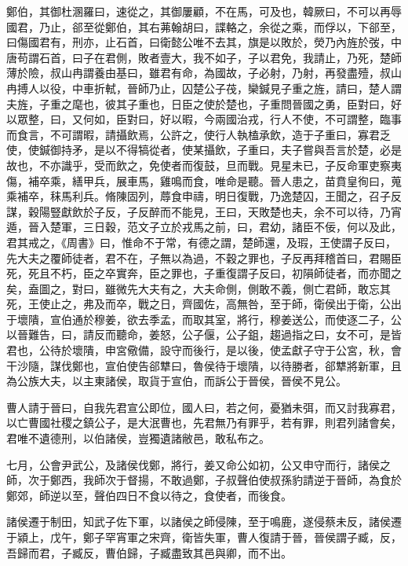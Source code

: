 \begin{pinyinscope}
鄭伯，其御杜溷羅曰，速從之，其御屢顧，不在馬，可及也，韓厥曰，不可以再辱國君，乃止，郤至從鄭伯，其右茀翰胡曰，諜輅之，余從之乘，而俘以，下郤至，曰傷國君有，刑亦，止石首，曰衛懿公唯不去其，旗是以敗於，熒乃內旌於弢，中唐苟謂石首，曰子在君側，敗者壹大，我不如子，子以君免，我請止，乃死，楚師薄於險，叔山冉謂養由基曰，雖君有命，為國故，子必射，乃射，再發盡殪，叔山冉搏人以役，中車折軾，晉師乃止，囚楚公子茷，欒鍼見子重之旌，請曰，楚人謂夫旌，子重之麾也，彼其子重也，日臣之使於楚也，子重問晉國之勇，臣對曰，好以眾整，曰，又何如，臣對曰，好以暇，今兩國治戎，行人不使，不可謂整，臨事而食言，不可謂暇，請攝飲焉，公許之，使行人執榼承飲，造于子重曰，寡君乏使，使鍼御持矛，是以不得犒從者，使某攝飲，子重曰，夫子嘗與吾言於楚，必是故也，不亦識乎，受而飲之，免使者而復鼓，旦而戰。見星未已，子反命軍吏察夷傷，補卒乘，繕甲兵，展車馬，雞鳴而食，唯命是聽。晉人患之，苗賁皇徇曰，蒐乘補卒，秣馬利兵。脩陳固列，蓐食申禱，明日復戰，乃逸楚囚，王聞之，召子反謀，穀陽豎獻飲於子反，子反醉而不能見，王曰，天敗楚也夫，余不可以待，乃宵遁，晉入楚軍，三日穀，范文子立於戎馬之前，曰，君幼，諸臣不佞，何以及此，君其戒之，《周書》曰，惟命不于常，有德之謂，楚師還，及瑕，王使謂子反曰，先大夫之覆師徒者，君不在，子無以為過，不穀之罪也，子反再拜稽首曰，君賜臣死，死且不朽，臣之卒實奔，臣之罪也，子重復謂子反曰，初隕師徒者，而亦聞之矣，盍圖之，對曰，雖微先大夫有之，大夫命側，側敢不義，側亡君師，敢忘其死，王使止之，弗及而卒，戰之日，齊國佐，高無咎，至于師，衛侯出于衛，公出于壞隤，宣伯通於穆姜，欲去季孟，而取其室，將行，穆姜送公，而使逐二子，公以晉難告，曰，請反而聽命，姜怒，公子偃，公子鉏，趨過指之曰，女不可，是皆君也，公待於壞隤，申宮儆備，設守而後行，是以後，使孟獻子守于公宮，秋，會干沙隨，謀伐鄭也，宣伯使告郤犨曰，魯侯待于壞隤，以待勝者，郤犨將新軍，且為公族大夫，以主東諸侯，取貨于宣伯，而訴公于晉侯，晉侯不見公。

曹人請于晉曰，自我先君宣公即位，國人曰，若之何，憂猶未弭，而又討我寡君，以亡曹國社稷之鎮公子，是大泯曹也，先君無乃有罪乎，若有罪，則君列諸會矣，君唯不遺德刑，以伯諸侯，豈獨遺諸敝邑，敢私布之。

七月，公會尹武公，及諸侯伐鄭，將行，姜又命公如初，公又申守而行，諸侯之師，次于鄭西，我師次于督揚，不敢過鄭，子叔聲伯使叔孫豹請逆于晉師，為食於鄭郊，師逆以至，聲伯四日不食以待之，食使者，而後食。

諸侯遷于制田，知武子佐下軍，以諸侯之師侵陳，至于鳴鹿，遂侵蔡未反，諸侯遷于潁上，戊午，鄭子罕宵軍之宋齊，衛皆失軍，曹人復請于晉，晉侯謂子臧，反，吾歸而君，子臧反，曹伯歸，子臧盡致其邑與卿，而不出。


\end{pinyinscope}
